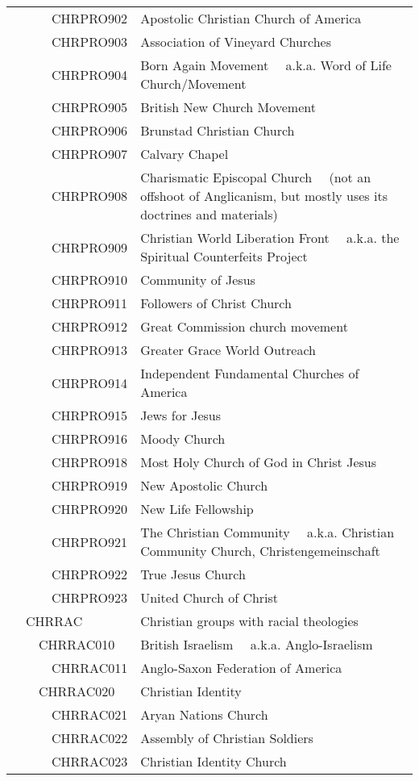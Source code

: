 \documentclass[12pt]{article}
\begin{document}
\begin{tiny}
\begin{center}
\begin{longtable}{|l|l|}
~~~~~~CHRPRO902 & Apostolic Christian Church of America \\
~~~~~~CHRPRO903 & Association of Vineyard Churches \\
~~~~~~CHRPRO904 & Born Again Movement	~~a.k.a. Word of Life Church/Movement \\
~~~~~~CHRPRO905 & British New Church Movement \\
~~~~~~CHRPRO906 & Brunstad Christian Church \\
~~~~~~CHRPRO907 & Calvary Chapel \\
~~~~~~CHRPRO908 & Charismatic Episcopal Church	~~(not an offshoot of Anglicanism, but mostly uses its doctrines and materials) \\
~~~~~~CHRPRO909 & Christian World Liberation Front	~~a.k.a. the Spiritual Counterfeits Project \\
~~~~~~CHRPRO910 & Community of Jesus \\
~~~~~~CHRPRO911 & Followers of Christ Church \\
~~~~~~CHRPRO912 & Great Commission church movement \\
~~~~~~CHRPRO913 & Greater Grace World Outreach \\
~~~~~~CHRPRO914 & Independent Fundamental Churches of America \\
~~~~~~CHRPRO915 & Jews for Jesus \\
~~~~~~CHRPRO916 & Moody Church \\
~~~~~~CHRPRO918 & Most Holy Church of God in Christ Jesus \\
~~~~~~CHRPRO919 & New Apostolic Church \\
~~~~~~CHRPRO920 & New Life Fellowship \\
~~~~~~CHRPRO921 & The Christian Community	~~a.k.a. Christian Community Church, Christengemeinschaft \\
~~~~~~CHRPRO922 & True Jesus Church \\
~~~~~~CHRPRO923 & United Church of Christ \\
~~CHRRAC & Christian groups with racial theologies \\
~~~~CHRRAC010 & British Israelism	~~a.k.a. Anglo-Israelism \\
~~~~~~CHRRAC011 & Anglo-Saxon Federation of America \\
~~~~CHRRAC020 & Christian Identity \\
~~~~~~CHRRAC021 & Aryan Nations Church \\
~~~~~~CHRRAC022 & Assembly of Christian Soldiers \\
~~~~~~CHRRAC023 & Christian Identity Church \\

\end{longtable}
\end{center}
\end{tiny}
\end{document}
